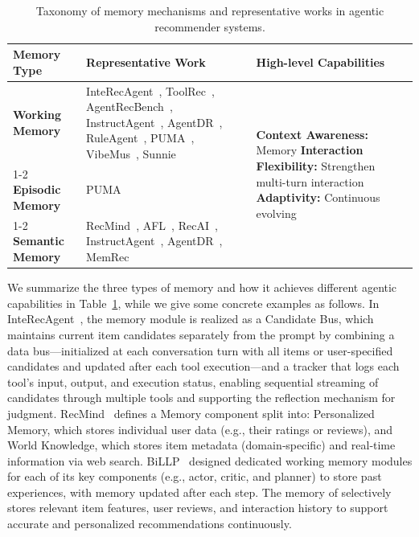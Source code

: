 \begin{table}[!t]
\caption{Taxonomy of memory mechanisms and representative works in agentic recommender systems.}
\label{tab:memory}
\small
\setlength{\tabcolsep}{4pt}
\begin{tabularx}{\columnwidth}{p{} X p{}}
\toprule
\textbf{Memory Type} & \textbf{Representative Work} & \textbf{High-level Capabilities} \\
\midrule
\textbf{Working Memory} 
& InteRecAgent~\cite{huang2024interecagent}, ToolRec~\cite{zhao2024toolrec}, AgentRecBench~\cite{shang2025agentrecbench}, InstructAgent~\cite{xu2025iagent}, AgentDR~\cite{yang2025agentdr}, RuleAgent~\cite{wang2025ruleagent}, PUMA~\cite{cai2025large}, VibeMus~\cite{guo2025vibemus}, Sunnie~\cite{wu2024sunnie}
& \multirow{3}{=}{\newline\textbf{Context Awareness:} Memory\newline
\textbf{Interaction Flexibility:} Strengthen multi-turn interaction\newline
\textbf{Adaptivity:} Continuous evolving} \\
\cmidrule{1-2}
\textbf{Episodic Memory} 
& PUMA~\cite{cai2025large}
& \\
\cmidrule{1-2}
\textbf{Semantic Memory} 
& RecMind~\cite{wang2024recmind}, AFL~\cite{cai2025agentic}, RecAI~\cite{lian2024recai}, InstructAgent~\cite{xu2025iagent}, AgentDR~\cite{yang2025agentdr}, MemRec~\cite{chen2026memrec}
& \\
\bottomrule
\end{tabularx}
\end{table}

{
We summarize the three types of memory and how it achieves different agentic capabilities in Table~\ref{tab:memory}, while we give some concrete examples as follows. 
In InteRecAgent~\cite{huang2024interecagent}, the memory module is realized as a Candidate Bus, which maintains current item candidates separately from the prompt by combining a data bus—initialized at each conversation turn with all items or user-specified candidates and updated after each tool execution—and a tracker that logs each tool’s input, output, and execution status, enabling sequential streaming of candidates through multiple tools and supporting the reflection mechanism for judgment.
RecMind~\cite{wang2024recmind} defines a Memory component split into: Personalized Memory, which stores individual user data (e.g., their ratings or reviews), and World Knowledge, which stores item metadata (domain‑specific) and real‑time information via web search.  
BiLLP~\cite{shi2024planner} designed dedicated working memory modules for each of its key components (e.g., actor, critic, and planner) to store past experiences, with memory updated after each step.
The memory of \cite{yu2025intelligent_agent} selectively stores relevant item features, user reviews, and interaction history to support accurate and personalized recommendations continuously.
}





